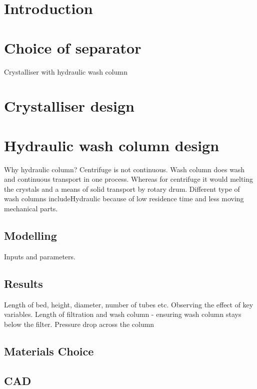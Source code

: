 \section{Introduction}


\section{Choice of separator}
Crystalliser with hydraulic wash column 



\section{Crystalliser design}




\section{Hydraulic wash column design}
Why hydraulic column?
Centrifuge is not continuous. Wash column does wash and continuous transport in one process. Whereas for centrifuge it would  melting the crystals and a means of solid transport by rotary drum. Different type of wash columns includeHydraulic because of low residence time and less moving mechanical parts. 

\subsection{Modelling}
Inputs and parameters. 



\subsection{Results}
Length of bed, height, diameter, number of tubes etc. Observing the effect of key variables. Length of filtration and wash column - ensuring wash column stays below the filter. Pressure drop across the column

\subsection{Materials Choice}

\subsection{CAD}

